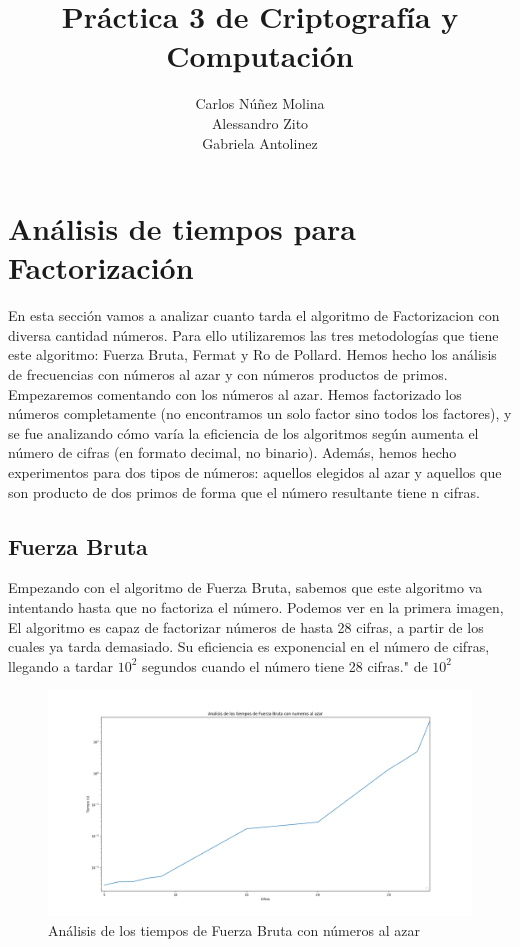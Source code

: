 \documentclass{article}
\title{Práctica 3 de Criptografía y Computación}
\date{}
\author{Carlos Núñez Molina \\ Alessandro Zito \\ Gabriela Antolinez}
\begin{document}
	\maketitle
	\newpage





    \section{Análisis de tiempos para Factorización}

    En esta sección vamos a analizar cuanto tarda el algoritmo de Factorizacion con diversa cantidad números. Para ello utilizaremos las tres metodologías que tiene este algoritmo: Fuerza Bruta, Fermat y Ro de Pollard. Hemos hecho los análisis de frecuencias con números al azar y con números productos de primos. Empezaremos comentando con los números al azar. Hemos factorizado los números completamente (no encontramos un solo factor sino todos los factores), y se fue analizando cómo varía la eficiencia de los algoritmos según aumenta el número de cifras (en formato decimal, no binario). Además, hemos hecho experimentos para dos tipos de números: aquellos elegidos al azar y aquellos que son producto de dos primos de forma que el número resultante tiene n cifras.

    \subsection{Fuerza Bruta}
    Empezando con el algoritmo de Fuerza Bruta, sabemos que este algoritmo va intentando hasta que no factoriza el número. Podemos ver en la primera imagen, El algoritmo es capaz de factorizar números de hasta 28 cifras, a partir de los cuales ya tarda demasiado. Su eficiencia es exponencial en el número de cifras, llegando a tardar \begin{math} 10^{2} \end{math} segundos cuando el número tiene 28 cifras." de \begin{math} 10^{2} \end{math}



    \begin{figure}[ht!]
        \centering
        \includegraphics[scale=0.3]{Figure_1}
        \caption{Análisis de los tiempos de Fuerza Bruta con números al azar}
        \label{fig:Figure_1}
    \end{figure}
\end{document}
